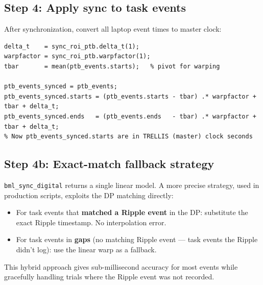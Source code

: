 \documentclass[11pt, a4paper]{article}
\begin{document}
\subsection{Step 4: Apply sync to task events}

After synchronization, convert all laptop event times to master clock:

\begin{lstlisting}[style=matlab]
% Apply the linear transformation from sync_roi_ptb
delta_t    = sync_roi_ptb.delta_t(1);
warpfactor = sync_roi_ptb.warpfactor(1);
tbar       = mean(ptb_events.starts);   % pivot for warping

ptb_events_synced = ptb_events;
ptb_events_synced.starts = (ptb_events.starts - tbar) .* warpfactor + tbar + delta_t;
ptb_events_synced.ends   = (ptb_events.ends   - tbar) .* warpfactor + tbar + delta_t;
% Now ptb_events_synced.starts are in TRELLIS (master) clock seconds
\end{lstlisting}

\subsection{Step 4b: Exact-match fallback strategy}
\label{sec:ptb_fallback}

\texttt{bml\_sync\_digital} returns a single linear model. A more precise strategy, used in production scripts, exploits the DP matching directly:

\begin{itemize}
  \item For task events that \textbf{matched a Ripple event} in the DP: substitute the exact Ripple timestamp. No interpolation error.
  \item For task events in \textbf{gaps} (no matching Ripple event --- task events the Ripple didn't log): use the linear warp as a fallback.
\end{itemize}

This hybrid approach gives sub-millisecond accuracy for most events while gracefully handling trials where the Ripple event was not recorded.
\end{document}
